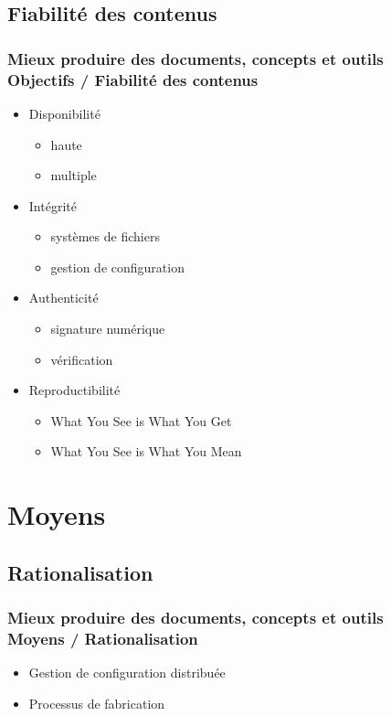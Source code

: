 \documentclass{beamer}
\def\hititle{Mieux produire des documents}
\def\lotitle{concepts et outils}
\def\fulltitle{\hititle, \lotitle}
\begin{document}
\subsection{Fiabilité des contenus}
\begin{frame}
\frametitle{\fulltitle\\Objectifs / Fiabilité des contenus}
\begin{itemize}
\item<1-> Disponibilité
    \begin{itemize}
    \item<2-> haute
    \item<3-> multiple
    \end{itemize}
\item<4-> Intégrité
    \begin{itemize}
    \item<5-> systèmes de fichiers
    \item<6-> gestion de configuration
    \end{itemize}
\item<7-> Authenticité
    \begin{itemize}
    \item<8-> signature numérique
    \item<9-> vérification
    \end{itemize}
\item<10-> Reproductibilité
    \begin{itemize}
    \item<11-> What You See is What You Get
    \item<12-> What You See is What You Mean
    \end{itemize}
\end{itemize}
\end{frame}
\section{Moyens}
\subsection{Rationalisation}
\begin{frame}
\frametitle{\fulltitle\\Moyens / Rationalisation}
\begin{itemize}
\item<1-> Gestion de configuration distribuée
\item<2-> Processus de fabrication
\end{itemize}
\end{frame}
\end{document}
